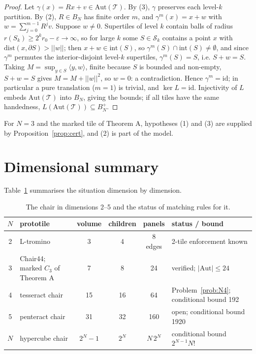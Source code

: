 \documentclass[11pt,a4paper]{article}
\theoremstyle{plain}
\theoremstyle{definition}
\begin{document}
\begin{proof}
Let $\gamma(x) = R x + v \in \mathrm{Aut}(\mathcal{T})$. By (3), $\gamma$ preserves each level-$k$ partition. By (2), $R \in B_N$ has finite order $m$, and $\gamma^m(x) = x + w$ with $w = \sum_{j=0}^{m-1} R^j v$. Suppose $w \ne  0$. Supertiles of level $k$ contain balls of radius $r(S_k) \ge  2^k r_0 - \varepsilon \to \infty$, so for large $k$ some $S \in \mathcal{S}_k$ contains a point $x$ with $\mathrm{dist}(x, \partial S) > ||w||$; then $x + w \in \mathrm{int}(S)$, so $\gamma^m (S) \cap \mathrm{int}(S) \ne  \emptyset$, and since $\gamma^m$ permutes the interior-disjoint level-$k$ supertiles, $\gamma^m (S) = S$, i.e. $S + w = S$. Taking $M = \sup_{y \in S} \langle y, w \rangle$, finite because $S$ is bounded and non-empty, $S + w = S$ gives $M = M + ||w||^2$, so $w = 0$: a contradiction. Hence $\gamma^m = \mathrm{\mathrm{id}}$; in particular a pure translation ($m = 1$) is trivial, and $\ker L = {\mathrm{\mathrm{id}}}$. Injectivity of $L$ embeds $\mathrm{Aut}(\mathcal{T})$ into $B_N$, giving the bounds; if all tiles have the same handedness, $L(\mathrm{Aut}(\mathcal{T})) \subseteq B_N^+$.
\end{proof}


For $N = 3$ and the marked tile of Theorem A, hypotheses (1) and (3) are supplied by Proposition~\ref{prop:cert}, and (2) is part of the model.

\section{Dimensional summary}

Table~\ref{tab:dim} summarises the situation dimension by dimension.

\begin{table}[t]\centering\small
\begin{tabular}{cp{2.6cm}ccc p{4.3cm}}\toprule
\textbf{$N$} & \textbf{prototile} & \textbf{volume} & \textbf{children} & \textbf{panels} & \textbf{status / bound} \\ \midrule
2 & L-tromino & 3 & 4 & 8 edges & 2-tile enforcement known \cite{gs99b} \\
3 & Chair44; marked $C_3$ of Theorem A & 7 & 8 & 24 & verified; $|\mathrm{Aut}| \le  24$ \\
4 & tesseract chair & 15 & 16 & 64 & Problem~\ref{prob:N4}; conditional bound 192 \\
5 & penteract chair & 31 & 32 & 160 & open; conditional bound 1920 \\
$N$ & hypercube chair & $2^N - 1$ & $2^N$ & $N\,2^N$ & conditional bound $2^{N-1} N!$ \\
\bottomrule\end{tabular}
\caption{The chair in dimensions 2--5 and the status of matching rules for it.}\label{tab:dim}\end{table}
\end{document}
